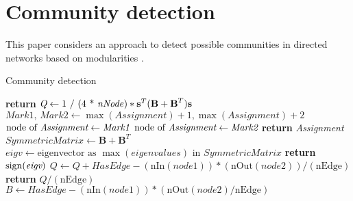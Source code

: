 \chapter[Short Chap title]{Community detection}
This paper considers an approach to detect possible communities in directed networks based on modularities \cite{PhysRevLett.100.118703}.

\begin{algorithm}[H]
	\caption{Community detection}\label{communitydetection}
	\begin{algorithmic}[1]
		\State \textbf{return} \emph{$\textit{Q} \gets \text{1 / (4 * \textit{nNode})} * \textbf{s}^T(\textbf{B}+\textbf{B}^T)\textbf{s}$}
		\EndProcedure
		\State $\textit{Mark1, Mark2} \gets \max( \textit{Assignment})+1, \max( \textit{Assignment})+2$
		 {$\text{node of } \textit{Assignment} \gets \emph{Mark1}$}
		\EndIf
		 {$\text{node of } \textit{Assignment} \gets \emph{Mark2}$}
		\EndIf
		\EndFor
		\State \textbf{return} \emph{Assignment}
		\EndProcedure
		\State $\textit{SymmetricMatrix} \gets  \textbf{B}+\textbf{B}^T$
		\State $\textit{eigv} \gets \text{eigenvector as }\max(eigenvalues) \text{ in } \textit{SymmetricMatrix}$
		\State \textbf{return} $\operatorname{sign}(\textit{eigv})$
		\EndProcedure
		\State $Q \gets Q + HasEdge - (\text{nIn}( \textit{node1}))*(\text{nOut}(\textit{node2}))/ (\text{nEdge})$
		\EndIf
		\EndFor
		\EndFor
		\State \textbf{return} \emph{$Q / (\text{nEdge})$}
		\EndProcedure
		\State $\textit{B} \gets \textit{HasEdge} - (\text{nIn}( \textit{node1}))*(\text{nOut}( \textit{node2})/\text{nEdge})$

\end{algorithmic}
\end{algorithm}
